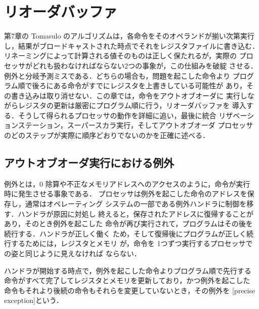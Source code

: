 \documentclass[../main.tex]{subfiles}
\begin{document}
\chapter{リオーダバッファ}

第7章の Tomasulo のアルゴリズムは，各命令をそのオペランドが揃い次第実行
し，結果がブロードキャストされた時点でそれをレジスタファイルに書き込む．
リネーミングによって計算される値そのものは正しく保たれるが，実際の
プロセッサがどれも扱わなければならない2つの事象が，この仕組みを破綻
させる．例外と分岐予測ミスである．どちらの場合も，問題を起こした命令より
プログラム順で後ろにある命令がすでにレジスタを上書きしている可能性が
あり，その書き込みは取り消せない．この章では，命令をアウトオブオーダに
実行しながらレジスタの更新は厳密にプログラム順に行う，リオーダバッファを
導入する．そうして得られるプロセッサの動作を詳細に追い，最後に統合
リザベーションステーション，スーパースカラ実行，そしてアウトオブオーダ
プロセッサのどのステップが実際に順序どおりでないのかを正確に述べる．

\section{アウトオブオーダ実行における例外}
\label{sec:l08-exceptions-ooo}

例外とは，0 除算や不正なメモリアドレスへのアクセスのように，命令が実行
時に発生させる事象である．%
プロセッサは例外を起こした命令のアドレスを保存し，通常はオペレーティング
システムの一部である例外ハンドラに制御を移す．ハンドラが原因に対処し
終えると，保存されたアドレスに復帰することがあり，そのとき例外を起こした
命令が再び実行されて，プログラムはその後を続行する．ハンドラが正しく働く
ため，そして復帰後にプログラムが正しく続行するためには，レジスタとメモリ
が，命令を 1つずつ実行するプロセッサでの姿と同じように見えなければ
ならない．

\begin{definition}[正確な例外]
  \label{def:l08-precise}
  ハンドラが開始する時点で，例外を起こした命令よりプログラム順で先行する
  命令がすべて完了してレジスタとメモリを更新しており，かつ例外を起こした
  命令もそれより後続の命令もそれらを変更していないとき，その例外を
  [precise exception]という．
\end{definition}
\end{document}
